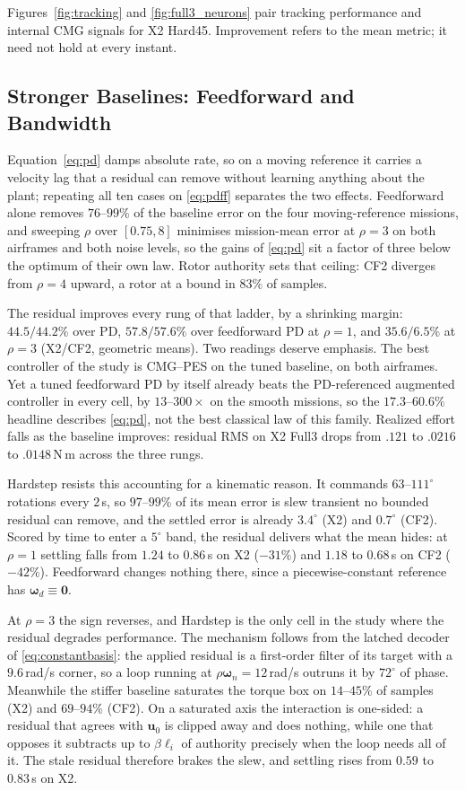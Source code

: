 \documentclass[letterpaper, 10 pt, conference]{ieeeconf}
\begin{document}
Figures~\ref{fig:tracking} and \ref{fig:full3_neurons} pair tracking
performance and internal CMG signals for X2 Hard45. Improvement refers to the
mean metric; it need not hold at every instant.

\subsection{Stronger Baselines: Feedforward and Bandwidth}
\label{sec:ladder}
Equation~\eqref{eq:pd} damps absolute rate, so on a moving reference it carries
a velocity lag that a residual can remove without learning anything about the
plant; repeating all ten cases on \eqref{eq:pdff} separates the two effects.
Feedforward alone removes $76$--$99\%$ of the baseline error on the four
moving-reference missions, and sweeping $\rho$ over $[0.75,8]$ minimises
mission-mean error at $\rho=3$ on both airframes and both noise levels, so the
gains of \eqref{eq:pd} sit a factor of three below the optimum of their own law.
Rotor authority sets that ceiling: CF2 diverges from $\rho=4$ upward, a rotor at
a bound in $83\%$ of samples.

The residual improves every rung of that ladder, by a shrinking margin:
$44.5/44.2\%$ over PD, $57.8/57.6\%$ over feedforward PD at $\rho=1$, and
$35.6/6.5\%$ at $\rho=3$ (X2/CF2, geometric means). Two readings deserve
emphasis. The best controller of the study is CMG--PES on the tuned baseline,
on both airframes. Yet a tuned feedforward PD by itself already beats the
PD-referenced augmented controller in every cell, by $13$--$300\times$ on the
smooth missions, so the $17.3$--$60.6\%$ headline describes \eqref{eq:pd}, not
the best classical law of this family. Realized effort falls as the baseline
improves: residual RMS on X2 Full3 drops from $.121$ to $.0216$ to
$.0148$\,N\,m across the three rungs.

Hardstep resists this accounting for a kinematic reason. It commands
$63$--$111^\circ$ rotations every $2$\,s, so $97$--$99\%$ of its mean error is
slew transient no bounded residual can remove, and the settled error is already
$3.4^\circ$ (X2) and $0.7^\circ$ (CF2). Scored by time to enter a $5^\circ$ band,
the residual delivers what the mean hides: at $\rho=1$ settling falls from $1.24$
to $0.86$\,s on X2 ($-31\%$) and $1.18$ to $0.68$\,s on CF2 ($-42\%$).
Feedforward changes nothing there, since a piecewise-constant reference has
$\bm\omega_d\equiv\bm0$.

At $\rho=3$ the sign reverses, and Hardstep is the only cell in the study where
the residual degrades performance. The mechanism follows from the latched
decoder of \eqref{eq:constantbasis}: the applied residual is a first-order
filter of its target with a $9.6$\,rad/s corner, so a loop running at
$\rho\bm\omega_n=12$\,rad/s outruns it by $72^\circ$ of phase. Meanwhile the
stiffer baseline saturates the torque box on $14$--$45\%$ of samples (X2) and
$69$--$94\%$ (CF2). On a saturated axis the interaction is one-sided: a residual
that agrees with $\bm u_0$ is clipped away and does nothing, while one that
opposes it subtracts up to $\beta\ell_i$ of authority precisely when the loop
needs all of it. The stale residual therefore brakes the slew, and settling
rises from $0.59$ to $0.83$\,s on X2.
\end{document}
